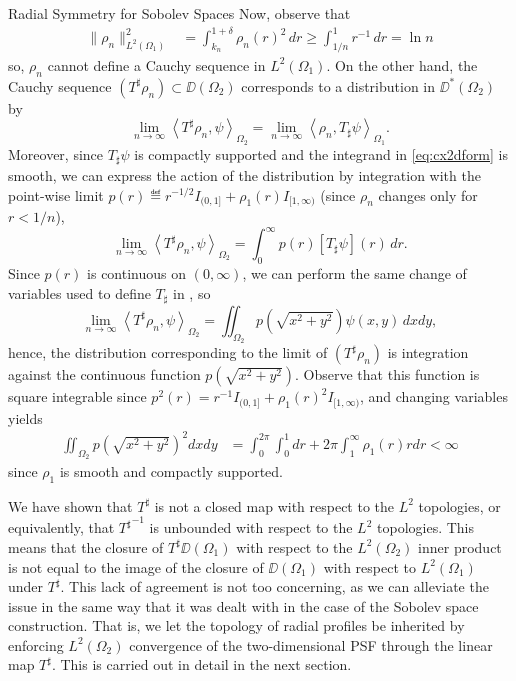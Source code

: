 \begin{chapter}{Radial Symmetry for Sobolev Spaces}
Now, observe that
\begin{align}
  \|\rho_n\|_{L^2(\Omega_1)}^2 
    &= \int_{k_n}^{1+\delta} \rho_n(r)^2\,dr \ge \int_{1/n}^1 r^{-1}\,dr = \ln n 
\end{align}
so, $\rho_n$ cannot define a Cauchy sequence in $L^2(\Omega_1)$.
On the other hand, the Cauchy sequence $(T^\sharp \rho_n) \subset \DD(\Omega_2)$ corresponds to a distribution in $\DD^*(\Omega_2)$ by
\begin{equation} \label{eq:cx2dform}
  \lim_{n\to\infty}\left\langle T^\sharp \rho_n,\psi \right\rangle_{\Omega_2} 
  = \lim_{n\to\infty}\left\langle \rho_n,T_\sharp \psi \right\rangle_{\Omega_1}.
\end{equation}
Moreover, since $T_\sharp \psi$ is compactly supported and the integrand in \eqref{eq:cx2dform} is smooth, we can express the action of the distribution by integration with the point-wise limit $p(r) \eqdef r^{-1/2}I_{(0,1]} + \rho_1(r)I_{[1,\infty)}$ (since $\rho_n$ changes only for $r<1/n$),
\begin{equation}
  \lim_{n\to\infty}\left\langle T^\sharp \rho_n,\psi \right\rangle_{\Omega_2} = \int_0^\infty p(r)[T_\sharp \psi](r)\,dr.
\end{equation}
Since $p(r)$ is continuous on $(0,\infty)$, we can perform the same change of variables used to define $T_\sharp$ in , so 
\begin{equation}
  \lim_{n\to\infty}\left\langle T^\sharp \rho_n,\psi \right\rangle_{\Omega_2} = \iint_{\Omega_2} p\left(\sqrt{x^2+y^2}\right)\psi(x,y)\,dxdy,
\end{equation}
hence, the distribution corresponding to the limit of $(T^\sharp \rho_n)$ is integration against the continuous function $p\left(\sqrt{x^2+y^2}\right)$.
Observe that this function is square integrable since $p^2(r) = r^{-1}I_{(0,1]} + \rho_1(r)^2I_{[1,\infty)}$, and changing variables yields
\begin{align}
  \iint_{\Omega_2} p\left(\sqrt{x^2+y^2}\right)^2 dxdy 
  &= \int_0^{2\pi}\int_0^1dr + 2\pi \int_1^\infty \rho_1(r)rdr <\infty
\end{align} 
since $\rho_1$ is smooth and compactly supported.

We have shown that $T^\sharp$ is not a closed map with respect to the $L^2$ topologies, or equivalently, that ${T^\sharp}^{-1}$ is unbounded with respect to the $L^2$ topologies.
This means that the closure of $T^\sharp \DD(\Omega_1)$ with respect to the $L^2(\Omega_2)$ inner product is not equal to the image of the closure of $\DD(\Omega_1)$ with respect to $L^2(\Omega_1)$ under $T^\sharp$. 
This lack of agreement is not too concerning, as we can alleviate the issue in the same way that it was dealt with in the case of the Sobolev space construction.
That is, we let the topology of radial profiles be inherited by enforcing $L^2(\Omega_2)$ convergence of the two-dimensional PSF through the linear map $T^\sharp$.
This is carried out in detail in the next section.


\end{chapter}
